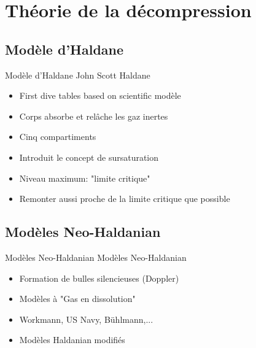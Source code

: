
\section{Théorie de la décompression}
\subsection{Modèle d'Haldane}

\begin{frame}{Modèle d'Haldane}
	John Scott Haldane
	\begin{itemize}
		\item First dive tables based on scientific modèle
		\item Corps absorbe et relâche les gaz inertes
		\item Cinq compartiments
		\item Introduit le concept de sursaturation
		\item Niveau maximum: "limite critique"
		\item Remonter aussi proche de la limite critique que possible
	\end{itemize}
\end{frame}

\subsection{Modèles Neo-Haldanian}

\begin{frame}{Modèles Neo-Haldanian}  
	Modèles Neo-Haldanian
	\begin{itemize}
		\item Formation de bulles silencieuses (Doppler)
		\item Modèles à "Gas en dissolution"
		\item Workmann, US Navy, Bühlmann,...
		\item Modèles Haldanian modifiés
	\end{itemize}
\end{frame}

